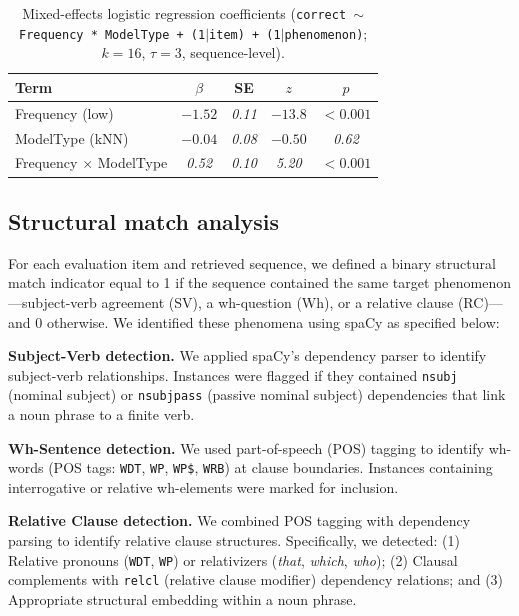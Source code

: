 \begin{table}[ht]
\centering
\small
\caption{Mixed-effects logistic regression coefficients
(\texttt{correct $\sim$ Frequency * ModelType + (1$\mid$item) + (1$\mid$phenomenon)}; $k=16$, $\tau=3$, sequence-level).}
\label{tab:mixed_effects}
\begin{tabular}{lcccc}
\toprule
Term & $\beta$ & SE & $z$ & $p$ \\
\midrule
Frequency (low)                    & \textit{$-1.52$} & \textit{0.11} & \textit{$-13.8$} & \textit{$<0.001$} \\
ModelType (kNN)                    & \textit{$-0.04$} & \textit{0.08} & \textit{$-0.50$}  & \textit{0.62} \\
Frequency $\times$ ModelType       & \textit{0.52}    & \textit{0.10} & \textit{5.20}    & \textit{$<0.001$} \\
\bottomrule
\end{tabular}
\end{table}



\subsection{Structural match analysis}
\label{app:struc_simi}

For each evaluation item and retrieved sequence, we defined a binary
structural match indicator equal to 1 if the sequence contained the same target phenomenon---subject-verb agreement (SV), a wh-question (Wh), or a relative clause (RC)---and 0 otherwise. We identified these phenomena using spaCy \citep{honnibal2020spacy} as specified below:

\textbf{Subject-Verb detection.} We applied spaCy's dependency parser to identify subject-verb relationships. Instances were flagged if they contained \texttt{nsubj} (nominal subject) or \texttt{nsubjpass} (passive nominal subject) dependencies that link a noun phrase to a finite verb.

\textbf{Wh-Sentence detection.} We used part-of-speech (POS) tagging to identify wh-words (POS tags: \texttt{WDT}, \texttt{WP}, \texttt{WP\$}, \texttt{WRB}) at clause boundaries. Instances containing interrogative or relative wh-elements were marked for inclusion.

\textbf{Relative Clause detection.} We combined POS tagging with dependency parsing to identify relative clause structures. Specifically, we detected: (1) Relative pronouns (\texttt{WDT}, \texttt{WP}) or relativizers (\emph{that}, \emph{which}, \emph{who}); (2) Clausal complements with \texttt{relcl} (relative clause modifier) dependency relations; and (3) Appropriate structural embedding within a noun phrase.



